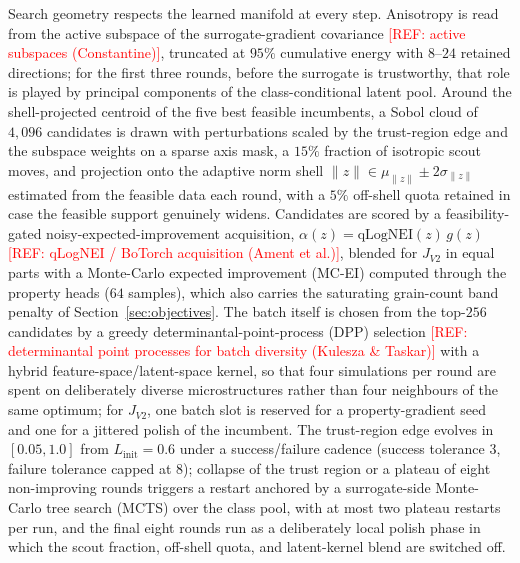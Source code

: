 \documentclass[preprint,12pt]{elsarticle}
\newcommand{\refneeded}[1]{\textcolor{red}{[REF: #1]}} %
\begin{document}
Search geometry respects the learned manifold at every step. Anisotropy is read from the active subspace of the surrogate-gradient covariance \refneeded{active subspaces (Constantine)}, truncated at $95\%$ cumulative energy with $8$--$24$ retained directions; for the first three rounds, before the surrogate is trustworthy, that role is played by principal components of the class-conditional latent pool. Around the shell-projected centroid of the five best feasible incumbents, a Sobol cloud of $4{,}096$ candidates is drawn with perturbations scaled by the trust-region edge and the subspace weights on a sparse axis mask, a $15\%$ fraction of isotropic scout moves, and projection onto the adaptive norm shell $\|z\| \in \mu_{\|z\|} \pm 2\sigma_{\|z\|}$ estimated from the feasible data each round, with a $5\%$ off-shell quota retained in case the feasible support genuinely widens. Candidates are scored by a feasibility-gated noisy-expected-improvement acquisition, $\alpha(z) = \mathrm{qLogNEI}(z)\, g(z)$ \refneeded{qLogNEI / BoTorch acquisition (Ament et al.)}, blended for $J_{V2}$ in equal parts with a Monte-Carlo expected improvement (MC-EI) computed through the property heads ($64$ samples), which also carries the saturating grain-count band penalty of Section~\ref{sec:objectives}. The batch itself is chosen from the top-$256$ candidates by a greedy determinantal-point-process (DPP) selection \refneeded{determinantal point processes for batch diversity (Kulesza \& Taskar)} with a hybrid feature-space/latent-space kernel, so that four simulations per round are spent on deliberately diverse microstructures rather than four neighbours of the same optimum; for $J_{V2}$, one batch slot is reserved for a property-gradient seed and one for a jittered polish of the incumbent. The trust-region edge evolves in $[0.05, 1.0]$ from $L_{\mathrm{init}} = 0.6$ under a success/failure cadence (success tolerance $3$, failure tolerance capped at $8$); collapse of the trust region or a plateau of eight non-improving rounds triggers a restart anchored by a surrogate-side Monte-Carlo tree search (MCTS) over the class pool, with at most two plateau restarts per run, and the final eight rounds run as a deliberately local polish phase in which the scout fraction, off-shell quota, and latent-kernel blend are switched off.
\end{document}
